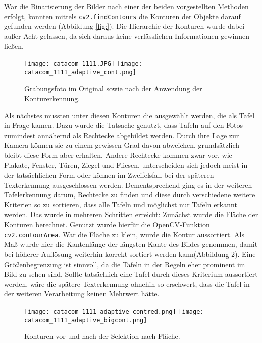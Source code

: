 War die Binarisierung der Bilder nach einer der beiden vorgestellten Methoden erfolgt, konnten mittels \verb|cv2.findContours| die Konturen der Objekte darauf gefunden werden (Abbildung \ref{fig:}). Die Hierarchie der Konturen wurde dabei außer Acht gelassen, da sich daraus keine verlässlichen Informationen gewinnen ließen.
\begin{figure}[h!]
\texttt{[image: catacom\_1111.JPG]}
\texttt{[image: catacom\_1111\_adaptive\_cont.png]}
\caption{Grabungsfoto im Original sowie nach der Anwendung der Konturerkennung.}
\label{fig:adaptivecont}
\end{figure}
Als nächstes mussten unter diesen Konturen die ausgewählt werden, die als Tafel in Frage kamen. Dazu wurde die Tatsache genutzt, dass Tafeln auf den Fotos zumindest annähernd als Rechtecke abgebildet werden. Durch ihre Lage zur Kamera können sie zu einem gewissen Grad davon abweichen, grundsätzlich bleibt diese Form aber erhalten. Andere Rechtecke kommen zwar vor, wie Plakate, Fenster, Türen, Ziegel und Fliesen, unterscheiden sich jedoch meist in der tatsächlichen Form oder können im Zweifelsfall bei der späteren Texterkennung ausgeschlossen werden. Dementsprechend ging es in der weiteren Tafelerkennung darum, Rechtecke zu finden und diese durch verschiedene weitere Kriterien so zu sortieren, dass alle Tafeln und möglichst nur Tafeln erkannt werden. Das wurde in mehreren Schritten erreicht:
Zunächst wurde die Fläche der Konturen berechnet. Genutzt wurde hierfür die OpenCV-Funktion \verb|cv2.contourArea|. War die Fläche zu klein, wurde die Kontur aussortiert. Als Maß wurde hier die Kantenlänge der längsten Kante des Bildes genommen, damit bei höherer Auflösung weiterhin korrekt sortiert werden kann(Abbildung \ref{fig:adaptivecontsize}). Eine Größenbegrenzung ist sinnvoll, da die Tafeln in der Regeln eher prominent im Bild zu sehen sind. Sollte tatsächlich eine Tafel durch dieses Kriterium aussortiert werden, wäre die spätere Texterkennung ohnehin so erschwert, dass die Tafel in der weiteren Verarbeitung keinen Mehrwert hätte.
\begin{figure}[h!]
\texttt{[image: catacom\_1111\_adaptive\_contred.png]}
\texttt{[image: catacom\_1111\_adaptive\_bigcont.png]}
\caption{Konturen vor und nach der Selektion nach Fläche.}
\label{fig:adaptivecontsize}
\end{figure}

